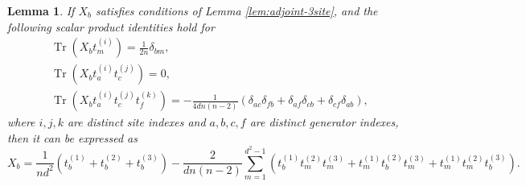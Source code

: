 \documentclass[11pt,letterpaper]{article}
\theoremstyle{plain}
\theoremstyle{plain}
\theoremstyle{plain}
\theoremstyle{plain}
\theoremstyle{plain}
\theoremstyle{plain}
\theoremstyle{plain}
\newtheorem{smlemma}[smtheorem]{Lemma}
\theoremstyle{definition}
\theoremstyle{plain}
\begin{document}
\begin{smlemma}\label{lem:covar_3-site_vector_operator}
    If $X_b$ satisfies conditions of Lemma \ref{lem:adjoint-3site}, and the following scalar product identities hold for 
    \[
        \begin{gathered}
            \operatorname{Tr}\left(X_b t_m^{(i)}\right)=\frac{1}{2 n} \delta_{b m},\\
            \operatorname{Tr}\left(X_b t_a^{(i)} t_c^{(j)}\right)=0,\\
            \operatorname{Tr}\left(X_b t_a^{(i)} t_c^{(j)} t_f^{(k)}\right)=-\frac{1}{4 d n (n-2)}\left(\delta_{a c} \delta_{f b} + \delta_{a f} \delta_{c b} + \delta_{c f} \delta_{a b}\right),
        \end{gathered}
    \]
    where $i, j, k$ are distinct site indexes and $a, b, c, f$ are distinct generator indexes,
    then it can be expressed as
    \[
        X_b=\frac{1}{n d^2}\left(t_b^{(1)}+t_b^{(2)}+t_b^{(3)}\right)-\frac{2}{d n(n-2)} \sum_{m=1}^{d^2-1}\left(t_b^{(1)} t_m^{(2)} t_m^{(3)}+t_m^{(1)} t_b^{(2)} t_m^{(3)}+t_m^{(1)} t_m^{(2)} t_b^{(3)}\right).
    \]
\end{smlemma}
\end{document}
